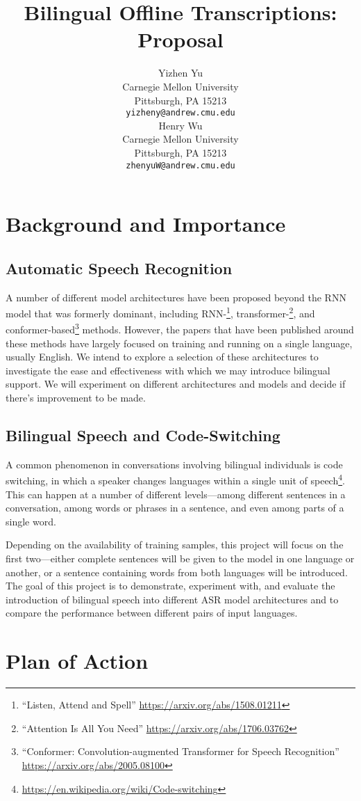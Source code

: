 \documentclass{article}
\title{Bilingual Offline Transcriptions: Proposal}
\author{
  Yizhen Yu \\
  Carnegie Mellon University\\
  Pittsburgh, PA 15213 \\
  \texttt{yizheny@andrew.cmu.edu} \\\And
  Henry Wu \\
  Carnegie Mellon University \\
  Pittsburgh, PA 15213 \\
  \texttt{zhenyuW@andrew.cmu.edu}
}
\begin{document}
  \maketitle
  \section{Background and Importance}
  \subsection{Automatic Speech Recognition}
  A number of different model architectures have been proposed beyond the RNN model that was formerly dominant, including RNN-\footnote{“Listen, Attend and Spell” \url{https://arxiv.org/abs/1508.01211}}, transformer-\footnote{“Attention Is All You Need” \url{https://arxiv.org/abs/1706.03762}}, and conformer-based\footnote{“Conformer: Convolution-augmented Transformer for Speech Recognition” \url{https://arxiv.org/abs/2005.08100}} methods. However, the papers that have been published around these methods have largely focused on training and running on a single language, usually English. We intend to explore a selection of these architectures to investigate the ease and effectiveness with which we may introduce bilingual support. We will experiment on different architectures and models and decide if there’s improvement to be made.
  \subsection{Bilingual Speech and Code-Switching}
  A common phenomenon in conversations involving bilingual individuals is code switching, in which a speaker changes languages within a single unit of speech\footnote{\url{https://en.wikipedia.org/wiki/Code-switching}}. This can happen at a number of different levels—among different sentences in a conversation, among words or phrases in a sentence, and even among parts of a single word.
  
  Depending on the availability of training samples, this project will focus on the first two—either complete sentences will be given to the model in one language or another, or a sentence containing words from both languages will be introduced. The goal of this project is to demonstrate, experiment with, and evaluate the introduction of bilingual speech into different ASR model architectures and to compare the performance between different pairs of input languages.
  \section{Plan of Action}
\end{document}

